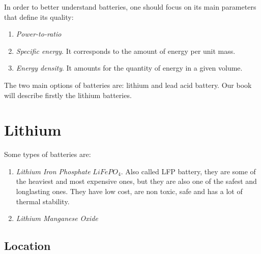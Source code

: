 In order to better understand batteries, one should focus on its main parameters that define its quality:



\begin{enumerate}
\item \textit{Power-to-ratio} %
\item \textit{Specific energy}. It corresponds to the amount of energy per unit mass.
\item \textit{Energy density}. It amounts for the quantity of energy in a given volume.
\end{enumerate}
The two main options of batteries are: lithium and lead acid battery. Our book will describe firstly the lithium batteries.

\section{Lithium}

Some types of batteries are:

\begin{enumerate}
\item \textit{Lithium Iron Phosphate} $LiFePO_4$. Also called LFP battery, they are some of the heaviest and most expensive ones, but they are also one of the safest and longlasting ones. They have low cost, are non toxic, safe and has a lot of thermal stability. 
\item \textit{Lithium Manganese Oxide} %
\end{enumerate}


\subsection{Location}




